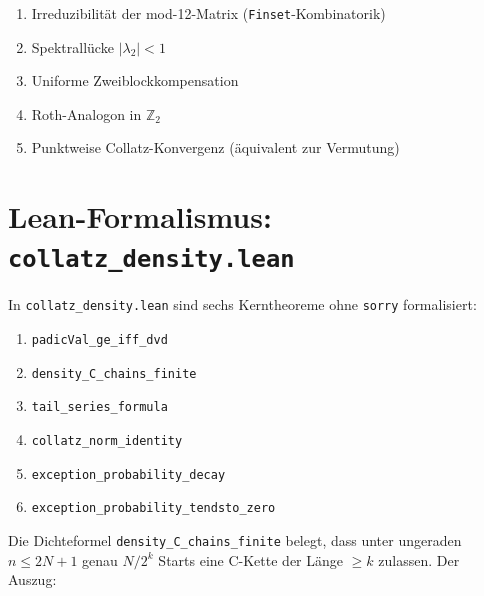 \documentclass[12pt,a4paper]{article}
\newcommand{\Ztwo}{\mathbb{Z}_2}
\begin{document}
\begin{enumerate}
  \item Irreduzibilität der mod-12-Matrix (\texttt{Finset}-Kombinatorik)
  \item Spektrallücke $|\lambda_2| < 1$
  \item Uniforme Zweiblockkompensation
  \item Roth-Analogon in $\Ztwo$
  \item Punktweise Collatz-Konvergenz (äquivalent zur Vermutung)
\end{enumerate}

\section{Lean-Formalismus: \texttt{collatz\_density.lean}}
\label{anhang:lean}

In \texttt{collatz\_density.lean} sind sechs Kerntheoreme ohne
\texttt{sorry} formalisiert:
\begin{enumerate}[label=(\roman*)]
  \item \texttt{padicVal\_ge\_iff\_dvd}
  \item \texttt{density\_C\_chains\_finite}
  \item \texttt{tail\_series\_formula}
  \item \texttt{collatz\_norm\_identity}
  \item \texttt{exception\_probability\_decay}
  \item \texttt{exception\_probability\_tendsto\_zero}
\end{enumerate}

Die Dichteformel \texttt{density\_C\_chains\_finite} belegt, dass unter
ungeraden $n \leq 2N+1$ genau $N/2^k$ Starts eine C-Kette der Länge
$\geq k$ zulassen. Der Auszug:


\end{document}
